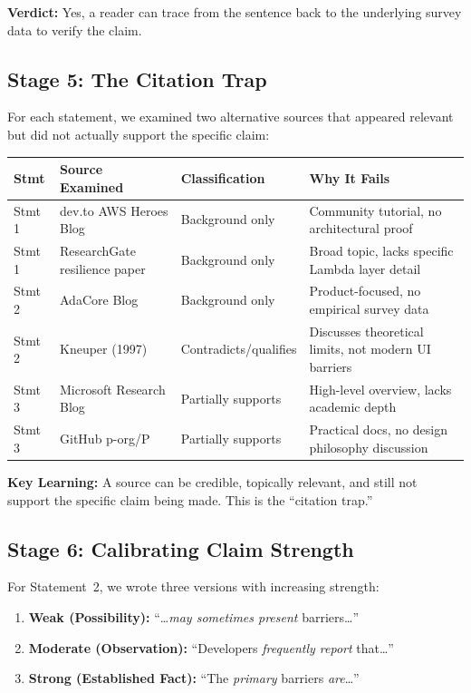 \documentclass[11pt, a4paper]{article}
\begin{document}
\noindent\textbf{Verdict:} Yes, a reader can trace from the sentence back to the underlying survey data to verify the claim.

\subsection{Stage 5: The Citation Trap}
For each statement, we examined two alternative sources that appeared relevant but did not actually support the specific claim:

\begin{longtable}{@{}p{2.5cm} p{4cm} p{3cm} p{4.5cm}@{}}
    \toprule
    \textbf{Stmt} & \textbf{Source Examined} & \textbf{Classification} & \textbf{Why It Fails} \\
    \midrule
    \endhead
    Stmt 1 & dev.to AWS Heroes Blog & Background only & Community tutorial, no architectural proof \\
    Stmt 1 & ResearchGate resilience paper & Background only & Broad topic, lacks specific Lambda layer detail \\
    Stmt 2 & AdaCore Blog & Background only & Product-focused, no empirical survey data \\
    Stmt 2 & Kneuper (1997) & Contradicts/qualifies & Discusses theoretical limits, not modern UI barriers \\
    Stmt 3 & Microsoft Research Blog & Partially supports & High-level overview, lacks academic depth \\
    Stmt 3 & GitHub p-org/P & Partially supports & Practical docs, no design philosophy discussion \\
    \bottomrule
\end{longtable}

\noindent\textbf{Key Learning:} A source can be credible, topically relevant, and still not support the specific claim being made. This is the ``citation trap.''

\subsection{Stage 6: Calibrating Claim Strength}
For Statement~2, we wrote three versions with increasing strength:
\begin{enumerate}[nosep]
    \item \textbf{Weak (Possibility):} ``\ldots \textit{may sometimes present} barriers\ldots''
    \item \textbf{Moderate (Observation):} ``Developers \textit{frequently report} that\ldots''
    \item \textbf{Strong (Established Fact):} ``The \textit{primary} barriers \textit{are}\ldots''
\end{enumerate}
\end{document}
